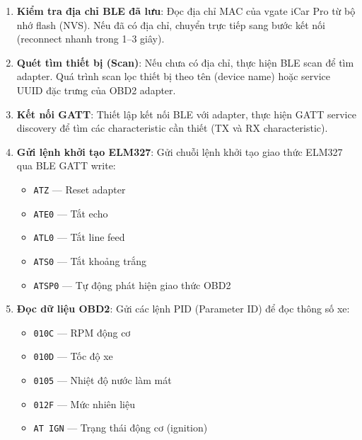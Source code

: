\documentclass[13pt,a4paper]{extarticle}
\renewcommand{\\}{\thesislongtableorignewline\hline}%
\providecommand{\tightlist}{%
  \setlength{\itemsep}{0pt}\setlength{\parskip}{0pt}}
\begin{document}
\begin{enumerate}
\def\labelenumi{\arabic{enumi}.}
\item
  \textbf{Kiểm tra địa chỉ BLE đã lưu}: Đọc địa chỉ MAC của vgate iCar
  Pro từ bộ nhớ flash (NVS). Nếu đã có địa chỉ, chuyển trực tiếp sang
  bước kết nối (reconnect nhanh trong 1--3 giây).
\item
  \textbf{Quét tìm thiết bị (Scan)}: Nếu chưa có địa chỉ, thực hiện BLE
  scan để tìm adapter. Quá trình scan lọc thiết bị theo tên (device
  name) hoặc service UUID đặc trưng của OBD2 adapter.
\item
  \textbf{Kết nối GATT}: Thiết lập kết nối BLE với adapter, thực hiện
  GATT service discovery để tìm các characteristic cần thiết (TX và RX
  characteristic).
\item
  \textbf{Gửi lệnh khởi tạo ELM327}: Gửi chuỗi lệnh khởi tạo giao thức
  ELM327 qua BLE GATT write:

  \begin{itemize}
  \tightlist
  \item
    \texttt{ATZ} --- Reset adapter
  \item
    \texttt{ATE0} --- Tắt echo
  \item
    \texttt{ATL0} --- Tắt line feed
  \item
    \texttt{ATS0} --- Tắt khoảng trắng
  \item
    \texttt{ATSP0} --- Tự động phát hiện giao thức OBD2
  \end{itemize}
\item
  \textbf{Đọc dữ liệu OBD2}: Gửi các lệnh PID (Parameter ID) để đọc
  thông số xe:

  \begin{itemize}
  \tightlist
  \item
    \texttt{010C} --- RPM động cơ
  \item
    \texttt{010D} --- Tốc độ xe
  \item
    \texttt{0105} --- Nhiệt độ nước làm mát
  \item
    \texttt{012F} --- Mức nhiên liệu
  \item
    \texttt{AT\ IGN} --- Trạng thái động cơ (ignition)
  \end{itemize}
\end{enumerate}
\end{document}
